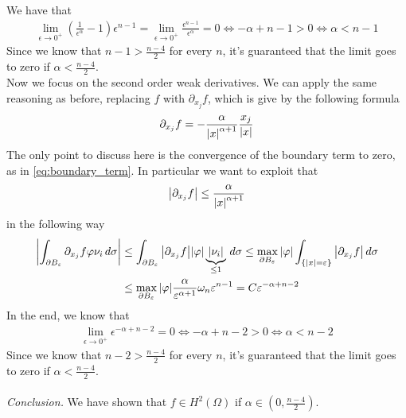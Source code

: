 We have that 
\[
    \begin{split}
        \lim_{\epsilon \to 0^+} \left(\frac{1}{\epsilon^\alpha}-1\right) \epsilon^{n-1} = \lim_{\epsilon \to 0^+} \frac{\epsilon^{n-1}}{\epsilon^\alpha}  = 0 \iff -\alpha + n - 1 >  0 \iff \alpha < n - 1
    \end{split}
\]
Since we know that $n - 1 > \frac{n-4}{2}$ for every \(n\), it's guaranteed that the limit goes to zero if \(\alpha < \frac{n-4}{2}\).\\
Now we focus on the second order weak derivatives. We can apply the same reasoning as before, replacing \(f\) with \(\partial_{x_j} f\), 
which is give by the following formula
\begin{equation*}
\partial_{x_j} f = -\frac{\alpha}{\abs{x}^{\alpha + 1}} \frac{x_j}{\abs{x}}
\end{equation*}
The only point to discuss here is the convergence of the boundary term to zero, as in \eqref{eq:boundary_term}.
In particular we want to exploit that 
\begin{equation*}
\abs{\partial_{x_j} f} \leq \frac{\alpha}{\abs{x}^{\alpha + 1}} 
\end{equation*}
in the following way
\begin{equation*}
    \begin{split}
    \abs{\int_{\partial B_\varepsilon} \partial_{x_j} f \varphi \nu_i \, d\sigma} & \leq \int_{\partial B_\varepsilon} \abs{\partial_{x_j} f} \abs{\varphi} \underbrace{\abs{\nu_i}}_{\leq 1} \, d\sigma \leq \max_{\partial B_\varepsilon} \abs{\varphi} \int_{\{ \abs{x} = \varepsilon \}} \abs{\partial_{x_j} f} \, d\sigma \\
                                                                 & \leq \max_{\partial B_\varepsilon} \abs{\varphi} \frac{\alpha}{\varepsilon^{\alpha+1}} \omega_n \varepsilon^{n-1} = C \varepsilon^{-\alpha + n - 2}
    \end{split}
\end{equation*}
In the end, we know that
\[
    \begin{split}
        \lim_{\epsilon \to 0^+} \epsilon^{-\alpha + n - 2} = 0 \iff -\alpha + n - 2 >  0 \iff \alpha < n - 2
    \end{split}
\]
Since we know that $n - 2 > \frac{n-4}{2}$ for every \(n\), it's guaranteed that the limit goes to zero if \(\alpha < \frac{n-4}{2}\).\\
\vspace{0.1cm}\\
\textit{Conclusion.} We have shown that \(f \in H^2(\Omega)\) if \(\alpha \in \left(0, \frac{n-4}{2}\right)\).


